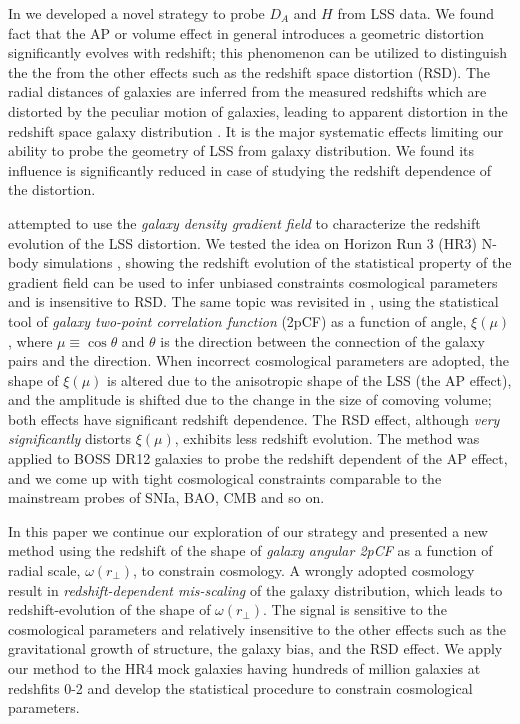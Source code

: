 \documentclass[iop]{emulateapj}
\begin{document}
In \cite{Li2014,Li2015,Li2016} we developed a novel strategy to probe $D_A$ and $H$ from LSS data.
We found fact that the AP or volume effect in general introduces a geometric distortion significantly evolves with redshift;
this phenomenon can be utilized to distinguish the the from the other effects such as the redshift space distortion (RSD).
The radial distances of galaxies are inferred from the measured redshifts which are distorted by the peculiar motion of galaxies, 
leading to apparent distortion in the redshift space galaxy distribution \citep{FOG,Kaiser1987,Ballinger1996}.
It is the major systematic effects limiting our ability to probe the geometry of LSS from galaxy distribution.
We found its influence is significantly reduced in case of studying the redshift dependence of the distortion.

\cite{Li2014} attempted to use the {\it galaxy density gradient field} 
to characterize the redshift evolution of the LSS distortion. 
We tested the idea on Horizon Run 3 (HR3) N-body simulations \citep{horizonrun},
showing the redshift evolution of the statistical property of the gradient field 
can be used to infer unbiased constraints cosmological parameters and is insensitive to RSD.
The same topic was revisited in \cite{Li2015}, 
using the statistical tool of {\it galaxy two-point correlation function} (2pCF) as a function of angle, $\xi(\mu)$, 
where $\mu\equiv \cos \theta$ and $\theta$ is the direction between the connection of the galaxy pairs and the direction.
When incorrect cosmological parameters are adopted, 
the shape of $\xi(\mu)$ is altered due to the anisotropic shape of the LSS (the AP effect), 
and the amplitude is shifted due to the change in the size of comoving volume;
both effects have significant redshift dependence.
The RSD effect, although {\it very significantly} distorts $\xi(\mu)$, 
exhibits less redshift evolution.
The method was applied to BOSS DR12 galaxies \citep{Li2016} to probe the redshift dependent of the AP effect, 
and we come up with tight cosmological constraints comparable to the mainstream probes of SNIa, BAO, CMB and so on.

In this paper we continue our exploration of our strategy and presented 
a new method using the redshift of the shape of {\it galaxy angular 2pCF} as a function of radial scale, $\omega(r_{\bot})$,
to constrain cosmology.
A wrongly adopted cosmology result in {\it redshift-dependent mis-scaling} of the galaxy distribution,
which leads to redshift-evolution of the shape of $\omega(r_{\bot})$.
The signal is sensitive to the cosmological parameters and relatively insensitive to the other effects such as the gravitational growth of structure,
the galaxy bias, and the RSD effect.
We apply our method to the HR4 mock galaxies having hundreds of million galaxies at redshfits 0-2
and develop the statistical procedure to constrain cosmological parameters.
 
\end{document}
